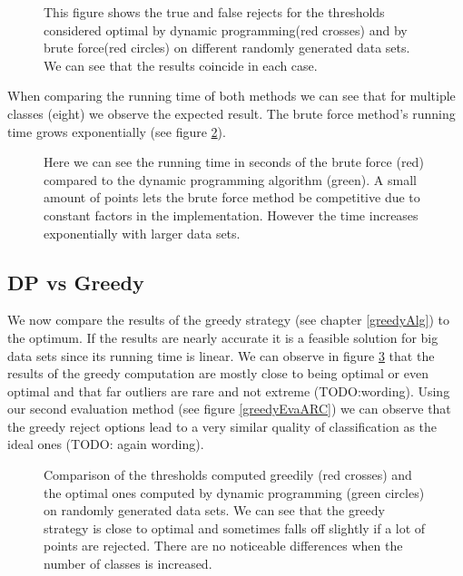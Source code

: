 \begin{figure}[!htbp]
\centering
\caption{This figure shows the true and false rejects for the thresholds considered optimal by dynamic programming(red crosses) and by brute force(red circles) on different randomly generated data sets. We can see that the results coincide in each case. }
\label{dpEvaPareto}
\end{figure}

When comparing the running time of both methods we can see that for multiple classes (eight) we observe the expected result. The brute force method's running time grows exponentially (see figure \ref{runTime}).

\begin{figure}[!htbp]
\centering
\caption{Here we can see the running time in seconds of the brute force (red) compared to the dynamic programming algorithm (green). A small amount of points lets the brute force method be competitive due to constant factors in the implementation. However the time increases exponentially with larger data sets.}
\label{runTime}
\end{figure}

\subsection{DP vs Greedy}
\label{DPvsGR}
We now compare the results of the greedy strategy (see chapter \ref{greedyAlg}) to the optimum. If the results are nearly accurate it is a feasible solution for big data sets since its running time is linear. We can observe in figure \ref{greedyEvaPareto} that the results of the greedy computation are mostly close to being optimal or even optimal and that far outliers are rare and not extreme (TODO:wording). Using our second evaluation method (see figure \ref{greedyEvaARC}) we can observe that the greedy reject options lead to a very similar quality of classification as the ideal ones (TODO: again wording).

\begin{figure}[!htbp]
\centering
\caption{Comparison of the thresholds computed greedily (red crosses) and the optimal ones computed by dynamic programming (green circles) on randomly generated data sets. We can see that the greedy strategy is close to optimal and sometimes falls off slightly if a lot of points are rejected. There are no noticeable differences when the number of classes is increased.}
\label{greedyEvaPareto}
\end{figure}


